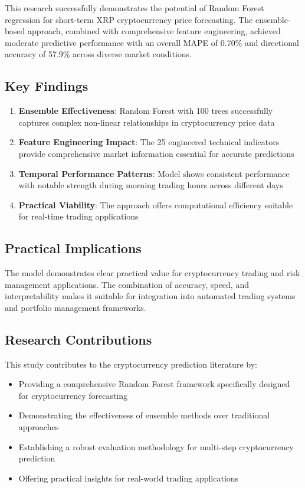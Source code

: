 \documentclass[11pt,a4paper]{article}
\begin{document}
This research successfully demonstrates the potential of Random Forest regression for short-term XRP cryptocurrency price forecasting. The ensemble-based approach, combined with comprehensive feature engineering, achieved moderate predictive performance with an overall MAPE of 0.70\% and directional accuracy of 57.9\% across diverse market conditions.

\subsection{Key Findings}

\begin{enumerate}
    \item \textbf{Ensemble Effectiveness}: Random Forest with 100 trees successfully captures complex non-linear relationships in cryptocurrency price data
    \item \textbf{Feature Engineering Impact}: The 25 engineered technical indicators provide comprehensive market information essential for accurate predictions
    \item \textbf{Temporal Performance Patterns}: Model shows consistent performance with notable strength during morning trading hours across different days
    \item \textbf{Practical Viability}: The approach offers computational efficiency suitable for real-time trading applications
\end{enumerate}

\subsection{Practical Implications}

The model demonstrates clear practical value for cryptocurrency trading and risk management applications. The combination of accuracy, speed, and interpretability makes it suitable for integration into automated trading systems and portfolio management frameworks.

\subsection{Research Contributions}

This study contributes to the cryptocurrency prediction literature by:
\begin{itemize}
    \item Providing a comprehensive Random Forest framework specifically designed for cryptocurrency forecasting
    \item Demonstrating the effectiveness of ensemble methods over traditional approaches
    \item Establishing a robust evaluation methodology for multi-step cryptocurrency prediction
    \item Offering practical insights for real-world trading applications
\end{itemize}
\end{document}

